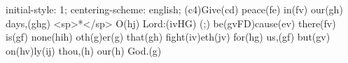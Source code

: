 initial-style: 1;
centering-scheme: english;
(c4)Give(cd) peace(fe) in(fv) our(gh) days,(ghg) <sp>*</sp> O(hj) Lord:(ivHG) (;) be(gvFD)cause(ev) there(fv) is(gf) none(hih) oth(g)er(g) that(gh) fight(iv)eth(jv) for(hg) us,(gf) but(gv) on(hv)ly(ij) thou,(h) our(h) God.(g)
